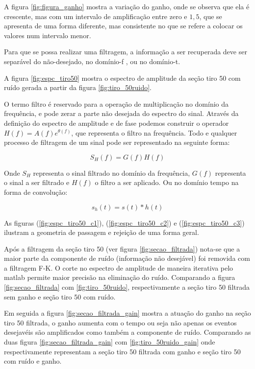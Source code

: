 A figura \ref{fig:figura_ganho} mostra a variação do ganho, onde se observa que ela é crescente, mas com um intervalo de amplificação entre zero e $1,5$, que se apresenta de uma forma diferente, mas consistente no que se refere a colocar os valores num intervalo menor.  

Para que se possa realizar uma filtragem, a informação a ser recuperada deve ser separável do não-desejado, no domínio-f , ou no domínio-t.

A figura \ref{fig:espc_tiro50} mostra o espectro de amplitude da seção tiro 50 com ruído gerada a partir da figura \ref{fig:tiro_50ruido}.

O termo filtro é reservado para a operação de multiplicação no domínio da frequência, e pode zerar a parte não desejada do espectro do sinal. Através da definição do espectro de amplitude e de fase podemos construir o operador $H(f)=A(f)e^{\theta(f)}$, que representa o filtro na frequência. Todo e qualquer processo de filtragem de um sinal pode ser representado na seguinte forma:

\begin{equation}
S_{H}(f)=G(f) H(f)
\label{eq:filtragem}
\end{equation}

Onde $S_{H}$ representa o sinal filtrado no domínio da frequência, $G(f)$ representa o sinal a ser filtrado e $H(f)$ o filtro a ser aplicado. Ou no domínio tempo na forma de convolução:

\begin{equation}
s_{h}(t)=s(t) \ast h(t)
\label{eq:filtragem_conv}
\end{equation}

As figuras (\ref{fig:espc_tiro50_c1}), (\ref{fig:espc_tiro50_c2}) e (\ref{fig:espc_tiro50_c3}) ilustram a geometria de passagem e rejeição de uma forma geral.

Após a filtragem da seção tiro 50 (ver figura \ref{fig:secao_filtrada}) nota-se que a maior parte da componente de ruído (informação não desejável) foi removida com a filtragem F-K. O corte no espectro de amplitude de maneira iterativa pelo matlab permite maior precisão na eliminação do ruído. Comparando a figura \ref{fig:secao_filtrada} com \ref{fig:tiro_50ruido}, respectivamente a seção tiro 50 filtrada sem ganho e seção tiro 50 com ruído.

Em seguida a figura \ref{fig:secao_filtrada_gain} mostra a atuação do ganho na seção tiro 50 filtrada, o ganho aumenta com o tempo ou seja não apenas os eventos desejavéis são amplificados como também a componente de ruído. Comparando as duas figura \ref{fig:secao_filtrada_gain} com \ref{fig:tiro_50ruido_gain} onde respectivamente representam a seção tiro 50 filtrada com ganho e seção tiro 50 com ruído e ganho.


